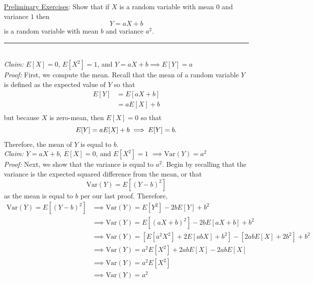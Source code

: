 \documentclass{article}
\newcommand{\statementsep}{\leavevmode\\[0.005in] \rule[\baselineskip/4]{\textwidth}{0.4pt}\leavevmode\\[0.005in]}
\begin{document}
\noindent\underline{Preliminary Exercises}: Show that if $X$ is a random variable with mean $0$ and variance $1$ then
\begin{equation*}
	Y = aX + b 
\end{equation*}
is a random variable with mean $b$ and variance $a^2$.
\statementsep
{\it Claim: } $E[X] = 0$, $E[X^2] = 1$, and $Y = aX + b \implies E[Y] = a$ \\[0.05in]
{\it Proof: } First, we compute the mean. Recall that the mean of a random variable $Y$is defined as the expected value of $Y$ so that
\begin{equation*}\begin{aligned}
	E[Y] &= E[aX + b] \\
       &= aE[X] + b \\
\end{aligned}\end{equation*}
but because $X$ is zero-mean, then $E[X] = 0$ so that
\begin{equation*}
	E[Y] = aE[X] + b\\ \implies E[Y] = b.
\end{equation*}
Therefore, the mean of $Y$ is equal to $b$.\\[0.2in]
{\it Claim: } $Y = aX + b$, $E[X] = 0$, and $E[X^2] = 1$ $\implies \text{Var}(Y) = a^2$ \\[0.05in]
{\it Proof: } Next, we show that the variance is equal to $a^2$. Begin by recalling that the variance is the expected squared difference from the mean, or that
\begin{equation*}
	\text{Var}(Y) = E[(Y - b)^2]
\end{equation*}
as the mean is equal to $b$ per our last proof. Therefore, 
\begin{equation*}\begin{aligned}
	\text{Var}(Y) = E[(Y - b)^2] &\implies \text{Var}(Y) = E[Y^2] - 2bE[Y] + b^2 \\
                           		 &\implies \text{Var}(Y) = E[(aX + b)^2] - 2bE[aX + b] + b^2\\
								               &\implies \text{Var}(Y) = \left [ E[a^2X^2] + 2E[abX] + b^2 \right ] - \left [ 2abE[X] + 2b^2 \right ] + b^2 \\
															 &\implies \text{Var}(Y) = a^2E[X^2] + 2abE[X] - 2abE[X]\\
															 &\implies \text{Var}(Y) = a^2E[X^2] \\
													     &\implies \text{Var}(Y) = a^2
\end{aligned}\end{equation*} 
\end{document}
